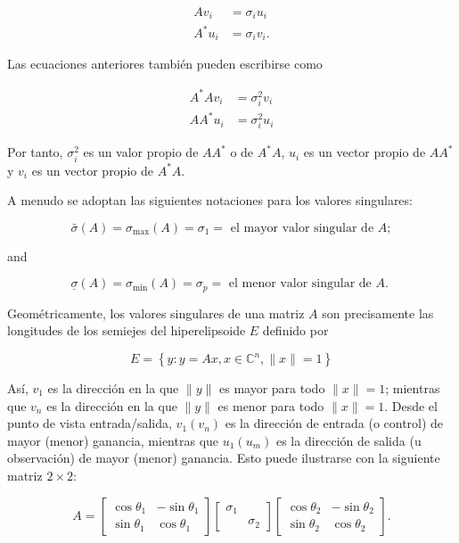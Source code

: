 \documentclass[11pt]{article}
\begin{document}
$$
\begin{aligned}
A v_{i} & =\sigma_{i} u_{i} \\
A^{*} u_{i} & =\sigma_{i} v_{i} .
\end{aligned}
$$

Las ecuaciones anteriores también pueden escribirse como

$$
\begin{aligned}
A^{*} A v_{i} & =\sigma_{i}^{2} v_{i} \\
A A^{*} u_{i} & =\sigma_{i}^{2} u_{i}
\end{aligned}
$$

Por tanto, $\sigma_{i}^{2}$ es un valor propio de $A A^{*}$ o de $A^{*} A$, $u_{i}$ es un vector propio de $A A^{*}$ y $v_{i}$ es un vector propio de $A^{*} A$.

A menudo se adoptan las siguientes notaciones para los valores singulares:

$$
\bar{\sigma}(A)=\sigma_{\max }(A)=\sigma_{1}=\text { el mayor valor singular de } A ;
$$

and

$$
\underline{\sigma}(A)=\sigma_{\min }(A)=\sigma_{p}=\text { el menor valor singular de } A \text {. }
$$

Geométricamente, los valores singulares de una matriz $A$ son precisamente las longitudes de los semiejes del hiperelipsoide $E$ definido por

$$
E=\left\{y: y=A x, x \in \mathbb{C}^{n},\|x\|=1\right\}
$$

Así, $v_{1}$ es la dirección en la que $\|y\|$ es mayor para todo $\|x\|=1$; mientras que $v_{n}$ es la dirección en la que $\|y\|$ es menor para todo $\|x\|=1$. Desde el punto de vista entrada/salida, $v_{1}\left(v_{n}\right)$ es la dirección de entrada (o control) de mayor (menor) ganancia, mientras que $u_{1}\left(u_{m}\right)$ es la dirección de salida (u observación) de mayor (menor) ganancia. Esto puede ilustrarse con la siguiente matriz $2 \times 2$:

$$
A=\left[\begin{array}{cc}
\cos \theta_{1} & -\sin \theta_{1} \\
\sin \theta_{1} & \cos \theta_{1}
\end{array}\right]\left[\begin{array}{ll}
\sigma_{1} & \\
& \sigma_{2}
\end{array}\right]\left[\begin{array}{cc}
\cos \theta_{2} & -\sin \theta_{2} \\
\sin \theta_{2} & \cos \theta_{2}
\end{array}\right] .
$$
\end{document}
